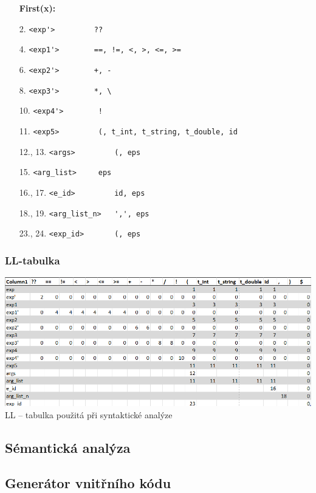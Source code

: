 \documentclass[12pt]{article}
\begin{document}
\begin{enumerate}[noitemsep]
    \textbf{First(x):}
            \item[2.] \verb|<exp'>         ??|
            \item[4.] \verb|<exp1'>        ==, !=, <, >, <=, >=|
            \item[6.] \verb|<exp2'>        +, -|
            \item[8.] \verb|<exp3'>        *, \|
            \item[10.] \verb|<exp4'>        !|
            \item[11.] \verb|<exp5>         (, t_int, t_string, t_double, id|
            \item[12., 13.] \verb|<args>         (, eps|
            \item[15.] \verb|<arg_list>     eps|
            \item[16., 17.] \verb|<e_id>         id, eps|
            \item[18., 19.] \verb|<arg_list_n>   ',', eps|
            \item[23., 24.] \verb|<exp_id>       (, eps|
            
        \end{enumerate}

\subsubsection{LL-tabulka}
\begin{table}[!ht]
		\centering
		\includegraphics[width=0.9\linewidth]{img/LL-table.png} \\
		\caption{LL -- tabulka použitá při syntaktické analýze}
		\label{table:ll_table}
	\end{table}

\subsection{Sémantická analýza}


\subsection{Generátor vnitřního kódu}

\end{document}
